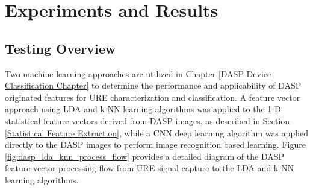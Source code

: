 
\chapter{Experiments and Results}
\label{Experiments and Results}

\section[Simulation Overview]{Testing Overview}

Two machine learning approaches are utilized in Chapter \ref{DASP Device Classification Chapter} to determine the performance and applicability of DASP originated features for URE characterization and classification.  A feature vector approach using LDA and k-NN learning algorithms was applied to the 1-D statistical feature vectors derived from DASP images, as described in Section \ref{Statistical Feature Extraction}, while a CNN deep learning algorithm was applied directly to the DASP images to perform image recognition based learning. Figure \ref{fig:dasp_lda_knn_process_flow} provides a detailed diagram of the DASP feature vector processing flow from URE signal capture to the LDA and k-NN learning algorithms. 


